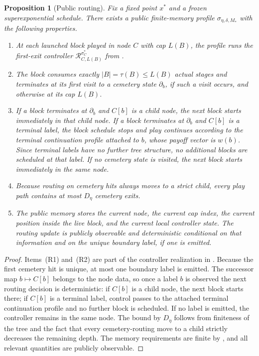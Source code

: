 \documentclass[12pt]{article}
\newtheorem{proposition}[theorem]{Proposition}
\theoremstyle{definition}
\newcommand{\1}{\mathbf{1}}
\begin{document}
\begin{proposition}[Public routing]
\label{prop:public-routing}
Fix a fixed point $x^*$ and a frozen superexponential schedule. There exists a
public finite-memory profile $\sigma_{\eta,\delta,M_*}$ with the following
properties.
\begin{enumerate}[label=\textnormal{(R\arabic*)},leftmargin=2.8em]
\item At each launched block played in node $C$ with cap $L(B)$, the profile runs
the first-exit controller $\mathcal R_{C,L(B)}^{\sigma_C^*}$ from
.
\item The block consumes exactly $|B|=\tau(B)\le L(B)$ actual stages and
terminates at its first visit to a cemetery state $\partial_b$, if such a visit
occurs, and otherwise at its cap $L(B)$.
\item If a block terminates at $\partial_b$ and $C[b]$ is a child node, the next
block starts immediately in that child node. If a block terminates at
$\partial_b$ and $C[b]$ is a terminal label, the block schedule stops and play
continues according to the terminal continuation profile attached to $b$, whose
payoff vector is $w(b)$. Since terminal labels have no further tree structure,
no additional blocks are scheduled at that label. If no cemetery state is
visited, the next block starts immediately in the same node.
\item Because routing on cemetery hits always moves to a strict child, every play
path contains at most $D_\eta$ cemetery exits.
\item The public memory stores the current node, the current cap index, the
current position inside the live block, and the current local controller state.
The routing update is publicly observable and deterministic conditional on that
information and on the unique boundary label, if one is emitted.
\end{enumerate}
\end{proposition}

\begin{proof}
Items~(R1) and~(R2) are part of the controller realization in
. Because the first cemetery hit is unique, at most one
boundary label is emitted. The successor map $b\mapsto C[b]$ belongs to the node
data, so once a label $b$ is observed the next routing decision is deterministic:
if $C[b]$ is a child node, the next block starts there; if $C[b]$ is a terminal
label, control passes to the attached terminal continuation profile and no
further block is scheduled. If no label is emitted, the controller remains in the
same node. The bound by $D_\eta$ follows from finiteness of the tree and the fact
that every cemetery-routing move to a child strictly decreases the remaining
depth. The memory requirements are finite by , and all
relevant quantities are publicly observable.
\end{proof}
\end{document}

